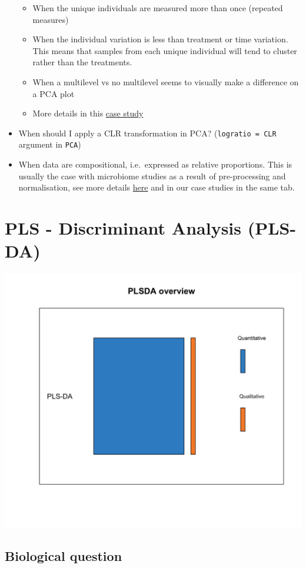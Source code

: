 \documentclass[]{book}
\providecommand{\tightlist}{%
  \setlength{\itemsep}{0pt}\setlength{\parskip}{0pt}}
\theoremstyle{definition}
\theoremstyle{definition}
\theoremstyle{definition}
\theoremstyle{remark}
\begin{document}
\begin{itemize}
  \begin{itemize}
  \tightlist
  \item
    When the unique individuals are measured more than once (repeated
    measures)
  \item
    When the individual variation is less than treatment or time
    variation. This means that samples from each unique individual will
    tend to cluster rather than the treatments.
  \item
    When a multilevel vs no multilevel seems to visually make a
    difference on a PCA plot
  \item
    More details in this
    \href{http://mixomics.org/case-studies/multilevel-vac18/}{case
    study}
  \end{itemize}
\item
  When should I apply a CLR transformation in PCA?
  (\texttt{logratio\ =\ \textquotesingle{}CLR\textquotesingle{}}
  argument in \texttt{PCA})
\item
  When data are compositional, i.e.~expressed as relative proportions.
  This is usually the case with microbiome studies as a result of
  pre-processing and normalisation, see more details
  \href{http://mixomics.org/mixmc/}{here} and in our case studies in the
  same tab.
\end{itemize}

\chapter{PLS - Discriminant Analysis (PLS-DA)}\label{plsda}

\begin{center}\includegraphics[width=0.5\linewidth]{Figures/overview-PLSDA-1} \end{center}

\section{Biological question}\label{biological-question-1}
\end{document}
